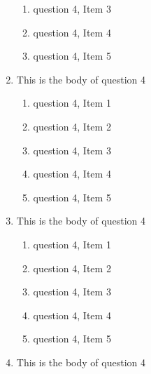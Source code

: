 \documentclass{article}
\begin{document}
\begin{enumerate}
\begin{enumerate}
    \item
    question 4, Item 3

    \item
    question 4, Item 4

    \item
    question 4, Item 5

  \end{enumerate}


\item
This is the body of question 4

  \begin{enumerate}

    \item
    question 4, Item 1

    \item
    question 4, Item 2

    \item
    question 4, Item 3

    \item
    question 4, Item 4

    \item
    question 4, Item 5

  \end{enumerate}

\item
This is the body of question 4

  \begin{enumerate}

    \item
    question 4, Item 1

    \item
    question 4, Item 2

    \item
    question 4, Item 3

    \item
    question 4, Item 4

    \item
    question 4, Item 5

  \end{enumerate}

\item
This is the body of question 4


\end{enumerate}
\end{document}

